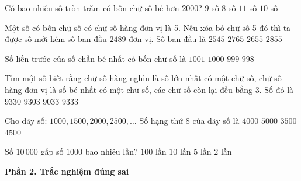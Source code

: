 \begin{ex} %
Có bao nhiêu số tròn trăm có bốn chữ số bé hơn $2000$?
\choice
{$9$ số}
{$8$ số}
{$11$ số}
{\True $10$ số}
\end{ex}

\begin{ex} %
Một số có bốn chữ số có chữ số hàng đơn vị là 5. Nếu xóa bỏ chữ số 5 đó thì ta được số mới kém số ban đầu $2489$ đơn vị. Số ban đầu là
\choice
{$2545$}
{\True $2765$}
{$2655$}
{$2855$}
\end{ex}

\begin{ex} %
Số liền trước của số chẵn bé nhất có bốn chữ số là
\choice
{$1001$}
{$1000$}
{\True $999$}
{$998$}
\end{ex}

\begin{ex} %
Tìm một số biết rằng chữ số hàng nghìn là số lớn nhất có một chữ số, chữ số hàng đơn vị là số bé nhất có một chữ số, các chữ số còn lại đều bằng 3. Số đó là
\choice
{\True $9330$}
{$9303$}
{$9033$}
{$9333$}
\end{ex}

\begin{ex} %
Cho dãy số: $1000, 1500, 2000, 2500, \dots$ Số hạng thứ 8 của dãy số là
\choice
{$4000$}
{$5000$}
{$3500$}
{\True $4500$}
\end{ex}

\begin{ex} %
Số $10\,000$ gấp số $1000$ bao nhiêu lần?
\choice
{$100$ lần}
{\True $10$ lần}
{$5$ lần}
{$2$ lần}
\end{ex}

\textbf{Phần 2. Trắc nghiệm đúng sai}

